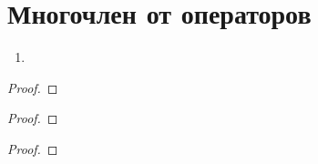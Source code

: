 \documentclass[main]{subfiles}
\begin{document}
\chapter{Многочлен от операторов}
\begin{proposition}
    \begin{enumerate}
        \item
    \end{enumerate}
\end{proposition}

\begin{proof}

\end{proof}

\begin{corollary}

\end{corollary}

\begin{proof}

\end{proof}

\begin{corollary}

\end{corollary}

\begin{proof}

\end{proof}

\begin{definition}

\end{definition}

\begin{lemma}

\end{lemma}
\end{document}
